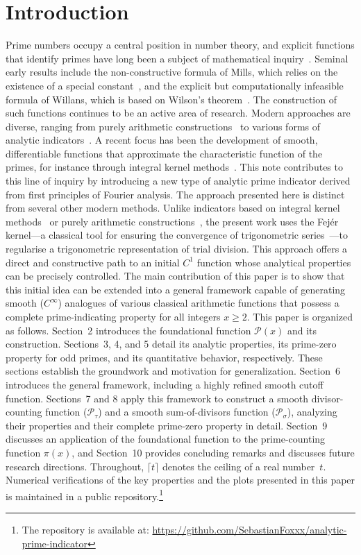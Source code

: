 \documentclass[11pt,a4paper]{amsart}
\newcommand{\Px}{\mathcal{P}}
\theoremstyle{plain}
\theoremstyle{definition}
\begin{document}
\section{Introduction}
Prime numbers occupy a central position in number theory, and explicit functions that identify primes have long been a subject of mathematical inquiry~\cite{hardy2008}.
Seminal early results include the non-constructive formula of Mills, which relies on the existence of a special constant~\cite{mills1947}, and the explicit but computationally infeasible formula of Willans, which is based on Wilson's theorem~\cite{willans1964}.
The construction of such functions continues to be an active area of research.
Modern approaches are diverse, ranging from purely arithmetic constructions~\cite{mazzanti2024} to various forms of analytic indicators~\cite{helfgott2023, hiary2018, seriprim2022}.
A recent focus has been the development of smooth, differentiable functions that approximate the characteristic function of the primes, for instance through integral kernel methods~\cite{semenov2025}.
This note contributes to this line of inquiry by introducing a new type of analytic prime indicator derived from first principles of Fourier analysis.
The approach presented here is distinct from several other modern methods.
Unlike indicators based on integral kernel methods~\cite{semenov2025} or purely arithmetic constructions~\cite{mazzanti2024}, the present work uses the Fejér kernel—a classical tool for ensuring the convergence of trigonometric series~\cite{zygmund2002}—to regularise a trigonometric representation of trial division.
This approach offers a direct and constructive path to an initial $C^1$ function whose analytical properties can be precisely controlled.
The main contribution of this paper is to show that this initial idea can be extended into a general framework capable of generating smooth ($C^\infty$) analogues of various classical arithmetic functions that possess a complete prime-indicating property for all integers $x \ge 2$.
This paper is organized as follows. Section~2 introduces the foundational function $\Px(x)$ and its construction.
Sections~3, 4, and 5 detail its analytic properties, its prime-zero property for odd primes, and its quantitative behavior, respectively.
These sections establish the groundwork and motivation for generalization. Section~6 introduces the general framework, including a highly refined smooth cutoff function.
Sections~7 and 8 apply this framework to construct a smooth divisor-counting function ($\Px_{\tau}$) and a smooth sum-of-divisors function ($\Px_{\sigma}$), analyzing their properties and their complete prime-zero property in detail.
Section~9 discusses an application of the foundational function to the prime-counting function $\pi(x)$, and Section~10 provides concluding remarks and discusses future research directions.
Throughout, $\lceil t \rceil$ denotes the ceiling of a real number~$t$.
Numerical verifications of the key properties and the plots presented in this paper is maintained in a public repository.\footnote{The repository is available at: \url{https://github.com/SebastianFoxxx/analytic-prime-indicator}}
\end{document}
